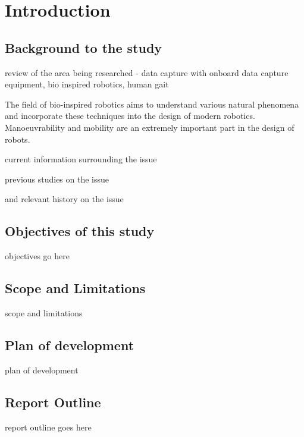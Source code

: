 \chapter{Introduction}
\section{Background to the study}
review of the area being researched - data capture with onboard data capture equipment, bio inspired robotics, human gait 

The field of bio-inspired robotics aims to understand various natural phenomena and incorporate these techniques into the design of modern robotics. Manoeuvrability and mobility are an extremely important part in the design of robots.      

current information surrounding the issue 

previous studies on the issue

and relevant history on the issue
  
\section{Objectives of this study}
objectives go here

\section{Scope and Limitations}
scope and limitations
  
\section{Plan of development}
plan of development
  
\section{Report Outline}
report outline goes here